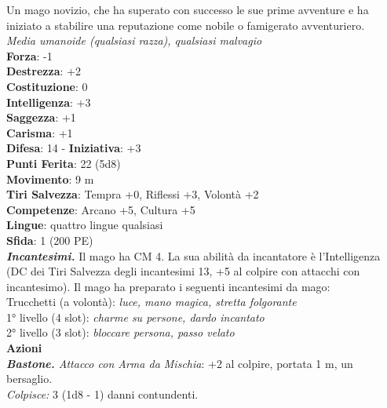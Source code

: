 \begin{multicols}{2}
Un mago novizio, che ha superato con successo le sue prime avventure e ha iniziato a stabilire una reputazione come nobile o famigerato avventuriero.\\
\emph{Media umanoide (qualsiasi razza), qualsiasi malvagio}\\
\textbf{Forza}: -1\\
\textbf{Destrezza}: +2\\
\textbf{Costituzione}: 0\\
\textbf{Intelligenza}: +3\\
\textbf{Saggezza}: +1\\
\textbf{Carisma}: +1\\
\textbf{Difesa}: 14 - \textbf{Iniziativa}: +3\\
\textbf{Punti Ferita}: 22 (5d8)\\
\textbf{Movimento}: 9 m\\
\textbf{Tiri Salvezza}: Tempra +0, Riflessi +3, Volontà +2 \\
\textbf{Competenze}: Arcano +5, Cultura +5\\
\textbf{Lingue}: quattro lingue qualsiasi\\
\textbf{Sfida}: 1 (200 PE)\smallskip\\
\emph{\textbf{Incantesimi.}} Il mago ha CM 4. La sua abilità da incantatore è l'Intelligenza (DC dei Tiri Salvezza degli incantesimi 13, +5 al colpire con attacchi con incantesimo). Il mago ha preparato i seguenti incantesimi da mago: \\
Trucchetti (a volontà): \emph{luce, mano magica, stretta folgorante} \\
1° livello (4 slot): \emph{charme su persone, dardo incantato} \\
2° livello (3 slot): \emph{bloccare persona, passo velato}\\
\smallskip\textbf{Azioni}\\
\emph{\textbf{Bastone.} Attacco con Arma da Mischia}: +2 al colpire, portata 1 m, un bersaglio.\\
\emph{Colpisce:} 3 (1d8 - 1) danni contundenti.\\


\end{multicols}

